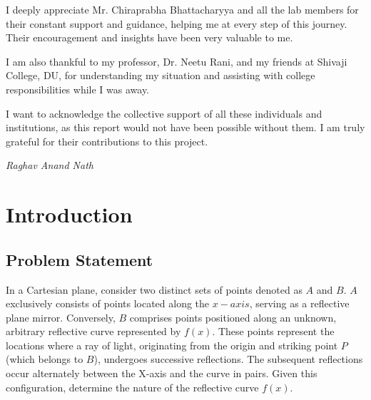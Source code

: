 \documentclass[12pt,a4paper,twoside]{report}
\begin{document}
I deeply appreciate Mr. Chiraprabha Bhattacharyya and all the lab members for their constant support and guidance, helping me at every step of this journey. Their encouragement and insights have been very valuable to me. 

I am also thankful to my professor, Dr. Neetu Rani, and my friends at Shivaji College, DU, for understanding my situation and assisting with college responsibilities while I was away. 

I want to acknowledge the collective support of all these individuals and institutions, as this report would not have been possible without them. I am truly grateful for their contributions to this project. \\

\begin{flushright}
	
	 \textit{Raghav Anand Nath}
\end{flushright}
\tableofcontents{}
\listoffigures



\chapter*{Introduction}
\section{Problem Statement}
In a Cartesian plane, consider two distinct sets of points denoted as $A$ and $B$. $A$ exclusively consists of points located along the $x-axis$, serving as a reflective plane mirror. Conversely, $B$ comprises points positioned along an unknown, arbitrary reflective curve represented by $f(x)$. These points represent the locations where a ray of light, originating from the origin and striking point $P$ (which belongs to $B$), undergoes successive reflections. The subsequent reflections occur alternately between the X-axis and the curve in pairs. Given this configuration, determine the nature of the reflective curve $f(x)$.
\end{document}
